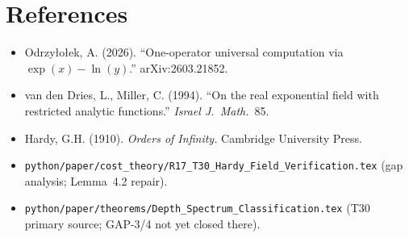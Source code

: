 \documentclass[12pt,a4paper]{article}
\theoremstyle{definition}
\theoremstyle{remark}
\begin{document}
\section*{References}

\begin{itemize}
  \item Odrzy\l{}o\l{}ek, A. (2026). ``One-operator universal computation via
        $\exp(x)-\ln(y)$.'' arXiv:2603.21852.
  \item van den Dries, L., Miller, C. (1994). ``On the real exponential field
        with restricted analytic functions.'' \textit{Israel J.\ Math.}~85.
  \item Hardy, G.H. (1910). \textit{Orders of Infinity.} Cambridge University Press.
  \item \texttt{python/paper/cost\_theory/R17\_T30\_Hardy\_Field\_Verification.tex}
        (gap analysis; Lemma~4.2 repair).
  \item \texttt{python/paper/theorems/Depth\_Spectrum\_Classification.tex}
        (T30 primary source; GAP-3/4 not yet closed there).
\end{itemize}
\end{document}
